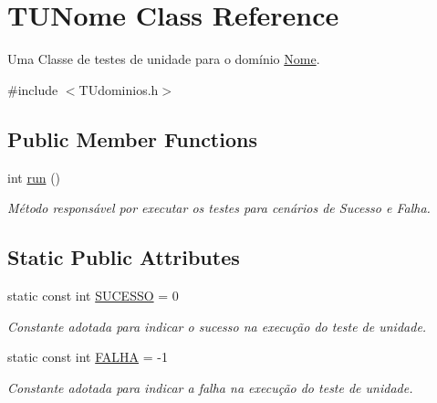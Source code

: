 \hypertarget{classTUNome}{}\section{T\+U\+Nome Class Reference}
\label{classTUNome}


Uma Classe de testes de unidade para o domínio \hyperlink{classNome}{Nome}.  




{\ttfamily \#include $<$T\+Udominios.\+h$>$}

\subsection*{Public Member Functions}
\begin{DoxyCompactItemize}
\item 
int \hyperlink{classTUNome_ae20734cb15f71890e57aff02a00f6313}{run} ()
\begin{DoxyCompactList}\small\item\em Método responsável por executar os testes para cenários de Sucesso e Falha. \end{DoxyCompactList}\end{DoxyCompactItemize}
\subsection*{Static Public Attributes}
\begin{DoxyCompactItemize}
\item 
\mbox{\label{classTUNome_af1d3faa5a4f6a302f96d193478f3013b}} 
static const int \hyperlink{classTUNome_af1d3faa5a4f6a302f96d193478f3013b}{S\+U\+C\+E\+S\+SO} = 0
\begin{DoxyCompactList}\small\item\em Constante adotada para indicar o sucesso na execução do teste de unidade. \end{DoxyCompactList}\item 
\mbox{\label{classTUNome_a50bf8928bc5e773eaf15a2fb5eb2f065}} 
static const int \hyperlink{classTUNome_a50bf8928bc5e773eaf15a2fb5eb2f065}{F\+A\+L\+HA} = -\/1
\begin{DoxyCompactList}\small\item\em Constante adotada para indicar a falha na execução do teste de unidade. \end{DoxyCompactList}\end{DoxyCompactItemize}


